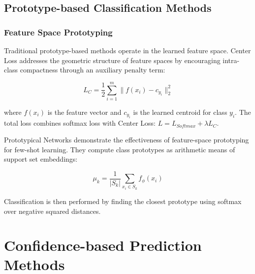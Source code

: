 \subsection{Prototype-based Classification Methods}

\subsubsection{Feature Space Prototyping}

Traditional prototype-based methods operate in the learned feature space. Center Loss \cite{Wen2016} addresses the geometric structure of feature spaces by encouraging intra-class compactness through an auxiliary penalty term:

$$L_C = \frac{1}{2}\sum_{i=1}^{m} \|f(x_i) - c_{y_i}\|_2^2$$

where $f(x_i)$ is the feature vector and $c_{y_i}$ is the learned centroid for class $y_i$. The total loss combines softmax loss with Center Loss: $L = L_{Softmax} + \lambda L_C$.

Prototypical Networks \cite{Snell2017} demonstrate the effectiveness of feature-space prototyping for few-shot learning. They compute class prototypes as arithmetic means of support set embeddings:

$$\mu_k = \frac{1}{|S_k|} \sum_{x_i \in S_k} f_\phi(x_i)$$

Classification is then performed by finding the closest prototype using softmax over negative squared distances.





\section{Confidence-based Prediction Methods}


